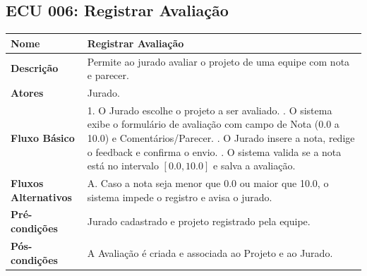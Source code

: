 \documentclass[12pt]{article}
\begin{document}
\subsection{ECU 006: Registrar Avaliação}
\begin{table}[H]
\centering
\small
\begin{tabular}{|p{3.2cm}|p{11.5cm}|}
\hline
\textbf{Nome} & Registrar Avaliação \\ \hline
\textbf{Descrição} & Permite ao jurado avaliar o projeto de uma equipe com nota e parecer. \\ \hline
\textbf{Atores} & Jurado. \\ \hline
\textbf{Fluxo Básico} & 
1. O Jurado escolhe o projeto a ser avaliado. \newline
2. O sistema exibe o formulário de avaliação com campo de Nota (0.0 a 10.0) e Comentários/Parecer. \newline
3. O Jurado insere a nota, redige o feedback e confirma o envio. \newline
4. O sistema valida se a nota está no intervalo $[0.0, 10.0]$ e salva a avaliação. \\ \hline
\textbf{Fluxos Alternativos} & 
A. Caso a nota seja menor que 0.0 ou maior que 10.0, o sistema impede o registro e avisa o jurado. \\ \hline
\textbf{Pré-condições} & Jurado cadastrado e projeto registrado pela equipe. \\ \hline
\textbf{Pós-condições} & A Avaliação é criada e associada ao Projeto e ao Jurado. \\ \hline
\end{tabular}
\end{table}
\end{document}

